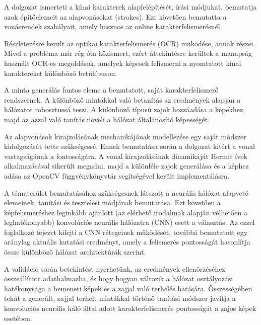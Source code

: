 
A dolgozat ismerteti a kínai karakterek alapfelépítését, írási módjukat, bemutatja azok építőelemeit az alapvonásokat (strokes). Ezt követően bemutatta a vonásrendek szabályait, amely hasznos az online karakterfelismerésnél.

Részletezésre került az optikai karakterfelismerés (OCR) müködése, annak részei. Mivel a probléma már rég óta közismert, ezért áttekintésre kerültek a manapság használt OCR-es megoldások, amelyek képesek felismerni a nyomtatott kínai karaktereket különböző betűtípuson.

A minta generálás fontos eleme a bemutatott, saját karakterfelismerő rendszernek. A különböző mintákkal való betanítás az eredmények alapján a hálózatot robosztussá teszi. A különböző típusú zajok hozzáadása a képekhez, majd az azzal való tanítás növeli a hálózat általánosító képességét.

Az alapvonások kirajzolásának mechanikájának modellezése egy saját módszer kidolgozását tette szükségessé. Ennek bemutatása során a dolgozat kitért a vonal vastagságának a fontosságára. A vonal kirajzolásának dinamikáját Hermit ívek alkalmazásával sikerült megadni, majd a különféle zajok generálása és a képhez adása az OpenCV függvénykönyvtár segítségével került implementálásra.

A tématerület bemutatásához szükségesnek látszott a neurális hálózat alapvető elemeinek, tanítási és tesztelési módjának bemutatása. Ezt követően a képfelismeréshez leginkább ajánlott (az elérhető irodalmak alapján vélhetően a leghatékonyabb) konvolúciós neurális hálózatra (CNN) esett a választás. Az ezzel foglalkozó fejezet kifejti a CNN rétegeinek működését, továbbá bemutatott egy aránylag aktuális kutatási eredményt, amely a felismerés pontosságát hasonlítja össze különböző hálózat architektúrák szerint.

A validáció során betekintést nyerhetünk, az eredmények ellenőrzéséhez összeállított adathalmazba, és hogy hogyan változik a hálózat osztályozási hatékonysága a bemeneti képek és a zajjal való terhelés hatására. Összességében tehát a generált, zajjal terhelt mintákkal történő tanítási módszer javítja a konvoluciós neurális háló által adott karakterfelismerés pontosságát a zajos képek esetében.
